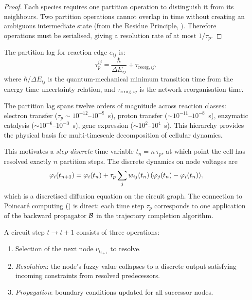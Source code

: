 \begin{proof}
Each species requires one partition operation to distinguish it from its
neighbours.  Two partition operations cannot overlap in time without
creating an ambiguous intermediate state (from the Residue Principle,
).  Therefore operations must be serialised,
giving a resolution rate of at most $1/\tau_p$.
\end{proof}

\begin{definition}
\label{def:ch08-partition-lag}
The partition lag for reaction edge $e_{ij}$ is:
\begin{equation}
  \tau_p^{ij}
  = \frac{\hbar}{\Delta E_{ij}} + \tau_{\mathrm{reorg},ij},
  \label{eq:partition-lag}
\end{equation}
where $\hbar/\Delta E_{ij}$ is the quantum-mechanical minimum transition
time from the energy-time uncertainty relation, and $\tau_{\mathrm{reorg},ij}$
is the network reorganisation time.
\end{definition}

The partition lag spans twelve orders of magnitude across reaction classes:
electron transfer ($\tau_p \sim 10^{-12}$--$10^{-9}$~s), proton transfer
($\sim 10^{-11}$--$10^{-8}$~s), enzymatic catalysis
($\sim 10^{-6}$--$10^{-3}$~s), gene expression ($\sim 10^{2}$--$10^{4}$~s).
This hierarchy provides the physical basis for multi-timescale decomposition
of cellular dynamics.

This motivates a \emph{step-discrete} time variable $t_n = n\,\tau_p$,
at which point the cell has resolved exactly $n$ partition steps.  The
discrete dynamics on node voltages are
\begin{equation}
  \varphi_i(t_{n+1})
  = \varphi_i(t_n)
    + \tau_p \sum_j w_{ij}(t_n)\,(\varphi_j(t_n) - \varphi_i(t_n)),
  \label{eq:discrete-dynamics}
\end{equation}
which is a discretised diffusion equation on the circuit graph.
The connection to Poincar\'{e} computing () is direct:
each time step $\tau_p$ corresponds to one application of the backward
propagator $\mathcal{B}$ in the trajectory completion algorithm.

\begin{definition}
\label{def:circuit-step}
A circuit step $t \to t+1$ consists of three operations:
\begin{enumerate}[label=(\roman*), noitemsep]
  \item Selection of the next node $v_{i_{t+1}}$ to resolve.
  \item \emph{Resolution}: the node's fuzzy value collapses to a discrete
        output satisfying incoming constraints from resolved predecessors.
  \item \emph{Propagation}: boundary conditions updated for all successor
        nodes.
\end{enumerate}
\end{definition}

